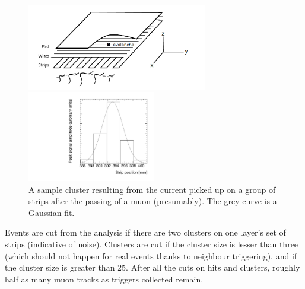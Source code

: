 \begin{figure}
    \centering
    \includegraphics[width = 0.7\textwidth]{figures/mwpc_lefebvre_thesis_gatti.png}
    \caption{A sketch of an sTGC-like detector. The position of the avalanche is extracted from the wires and strips that picked up the avalanche signal. The signals on individual strips are sketched. Clustering was the processs of fitting a Gaussian to the peak value of the signals on individual contiguous strips, as is done in figure~\ref{fig:sample_cluster}. In this work, the $x$($y$)-coordinate will always refer to the coordinate perpendicular to the wires (strips)~\cite{lefebvre_thesis, gatti_optimum_1979}.}
    \label{fig:mwpc_coords}
    \vspace*{\floatsep}
    \centering
    \includegraphics[width = 0.5\textwidth]{figures/sample_cluster_QL2C04_event5_layer2.pdf}
    \caption{A sample cluster resulting from the current picked up on a group of strips  after the passing of a muon (presumably). The grey curve is a Gaussian fit.}
    \label{fig:sample_cluster}
\end{figure}

Events are cut from the analysis if there are two clusters on one layer's set of strips (indicative of noise). Clusters are cut if the cluster size is lesser than three (which should not happen for real events thanks to neighbour triggering), and if the cluster size is greater than 25. After all the cuts on hits and clusters, roughly half as many muon tracks as triggers collected remain.

